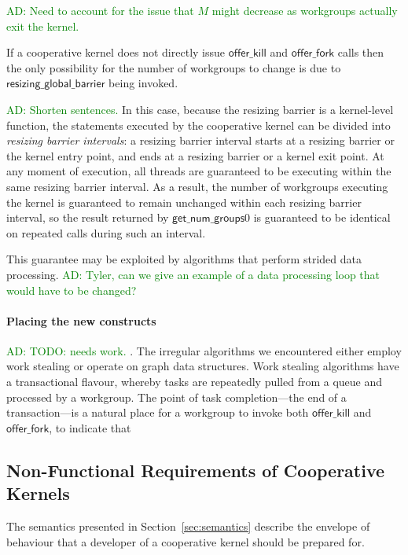 \documentclass[nocopyrightspace]{sigplanconf-pldi16}
\newcommand{\ADComment}[1]{\textcolor{green}{AD: #1}}
\newcommand{\offerfork}{\mathsf{offer\_fork}}
\newcommand{\offerkill}{\mathsf{offer\_kill}}
\newcommand{\resizingglobalbarrier}{\mathsf{resizing\_global\_barrier}}
\newcommand{\getnumgroups}{\mathsf{get\_num\_groups}}
\begin{document}
\ADComment{Need to account for the issue that $M$ might decrease as
  workgroups actually exit the kernel.}

If a cooperative kernel does not directly issue $\offerkill$ and
$\offerfork$ calls then the only possibility for the number of
workgroups to change is due to $\resizingglobalbarrier$ being invoked.

\ADComment{Shorten sentences.}
In this case, because the resizing barrier is a kernel-level function,
the statements executed by the cooperative kernel can be divided into
\emph{resizing barrier intervals}: a resizing barrier interval starts
at a resizing barrier or the kernel entry point, and ends at a
resizing barrier or a kernel exit point.  At any moment of execution,
all threads are guaranteed to be executing within the same resizing
barrier interval.  As a result, the number of workgroups executing the
kernel is guaranteed to remain unchanged within each resizing barrier
interval, so the result returned by $\getnumgroups{0}$ is guaranteed
to be identical on repeated calls during such an interval.

This guarantee may be exploited by algorithms that perform strided data
processing.  \ADComment{Tyler, can we give an example of a data
  processing loop that would have to be changed?}

\paragraph{Placing the new constructs}

\ADComment{TODO: needs work.}
.  The irregular
algorithms we encountered either employ work stealing or operate on
graph data structures.  Work stealing algorithms have a transactional
flavour, whereby tasks are repeatedly pulled from a queue and
processed by a workgroup.  The point of task completion---the end of a transaction---is a natural place for a workgroup to invoke both $\offerkill$ and $\offerfork$, to indicate that 



\subsection{Non-Functional Requirements of Cooperative Kernels}\label{sec:nonfunctional}

The semantics presented in Section~\ref{sec:semantics} describe the envelope of
behaviour that a developer of a cooperative kernel should be prepared
for.
\end{document}
